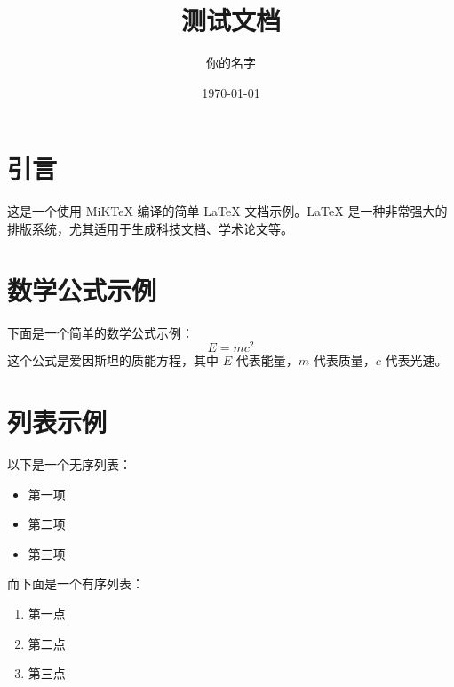 \documentclass{ctexart}
\title{测试文档}
\author{你的名字}
\date{\today}
\begin{document}
\maketitle

\section{引言}
这是一个使用 MiKTeX 编译的简单 LaTeX 文档示例。LaTeX 是一种非常强大的排版系统，尤其适用于生成科技文档、学术论文等。

\section{数学公式示例}
下面是一个简单的数学公式示例：
\[
E = mc^2
\]
这个公式是爱因斯坦的质能方程，其中 \(E\) 代表能量，\(m\) 代表质量，\(c\) 代表光速。

\section{列表示例}
以下是一个无序列表：
\begin{itemize}
    \item 第一项
    \item 第二项
    \item 第三项
\end{itemize}

而下面是一个有序列表：
\begin{enumerate}
    \item 第一点
    \item 第二点
    \item 第三点
\end{enumerate}
\end{document}
